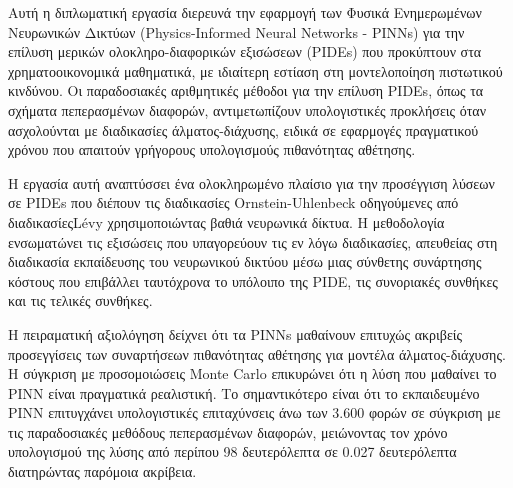    

\begin{greekabstract}
    Αυτή η διπλωματική εργασία διερευνά την εφαρμογή των Φυσικά Ενημερωμένων Νευρωνικών Δικτύων (Physics-Informed Neural Networks - PINNs) για την επίλυση μερικών ολοκληρο-διαφορικών εξισώσεων (PIDEs) που προκύπτουν στα χρηματοοικονομικά μαθηματικά, με ιδιαίτερη εστίαση στη μοντελοποίηση πιστωτικού κινδύνου. Οι παραδοσιακές αριθμητικές μέθοδοι για την επίλυση PIDEs, όπως τα σχήματα πεπερασμένων διαφορών, αντιμετωπίζουν υπολογιστικές προκλήσεις όταν ασχολούνται με διαδικασίες άλματος-διάχυσης, ειδικά σε εφαρμογές πραγματικού χρόνου που απαιτούν γρήγορους υπολογισμούς πιθανότητας αθέτησης.

    Η εργασία αυτή αναπτύσσει ένα ολοκληρωμένο πλαίσιο για την προσέγγιση λύσεων σε PIDEs που διέπουν τις διαδικασίες Ornstein-Uhlenbeck οδηγούμενες από διαδικασίεςLévy χρησιμοποιώντας βαθιά νευρωνικά δίκτυα. Η μεθοδολογία ενσωματώνει τις εξισώσεις που υπαγορεύουν τις εν λόγω διαδικασίες, απευθείας στη διαδικασία εκπαίδευσης του νευρωνικού δικτύου μέσω μιας σύνθετης συνάρτησης κόστους που επιβάλλει ταυτόχρονα το υπόλοιπο της PIDE, τις συνοριακές συνθήκες και τις τελικές συνθήκες.
    
    Η πειραματική αξιολόγηση δείχνει ότι τα PINNs μαθαίνουν επιτυχώς ακριβείς προσεγγίσεις των συναρτήσεων πιθανότητας αθέτησης για μοντέλα άλματος-διάχυσης. Η σύγκριση με προσομοιώσεις Monte Carlo επικυρώνει ότι η λύση που μαθαίνει το PINN είναι πραγματικά ρεαλιστική. Το σημαντικότερο είναι ότι το εκπαιδευμένο PINN επιτυγχάνει υπολογιστικές επιταχύνσεις άνω των 3.600 φορών σε σύγκριση με τις παραδοσιακές μεθόδους πεπερασμένων διαφορών, μειώνοντας τον χρόνο υπολογισμού της λύσης από περίπου 98 δευτερόλεπτα σε 0.027 δευτερόλεπτα διατηρώντας παρόμοια ακρίβεια.
    

\end{greekabstract}

